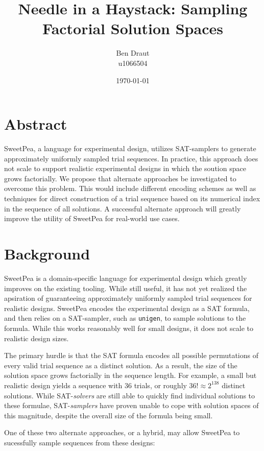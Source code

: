 \documentclass[a4paper]{article}
\title{Needle in a Haystack: Sampling Factorial Solution Spaces}
\author{Ben Draut \\ u1066504}
\date{\today}
\begin{document}
\maketitle


\section*{Abstract}

SweetPea, a language for experimental design, utilizes SAT-samplers to generate approximately uniformly sampled trial sequences. In practice, this approach does not scale to support realistic experimental designs in which the soution space grows factorially. We propose that alternate approaches be investigated to overcome this problem. This would include different encoding schemes as well as techniques for direct construction of a trial sequence based on its numerical index in the sequence of all solutions. A successful alternate approach will greatly improve the utility of SweetPea for real-world use cases.

\section*{Background}

SweetPea is a domain-specific language for experimental design which greatly improves on the existing tooling. While still useful, it has not yet realized the apsiration of guaranteeing approximately uniformly sampled trial sequences for realistic designs. SweetPea encodes the experimental design as a SAT formula, and then relies on a SAT-sampler, such as \texttt{unigen}, to sample solutions to the formula. While this works reasonably well for small designs, it does not scale to realistic design sizes.

The primary hurdle is that the SAT formula encodes all possible permutations of every valid trial sequence as a distinct solution. As a result, the size of the solution space grows factorially in the sequence length. For example, a small but realistic design yields a sequence with $36$ trials, or roughly $36! \approx 2^{138}$ distinct solutions. While SAT-\textit{solvers} are still able to quickly find individual solutions to these formulae, SAT-\textit{samplers} have proven unable to cope with solution spaces of this magnitude, despite the overall size of the formula being small.

One of these two alternate approaches, or a hybrid, may allow SweetPea to sucessfully sample sequences from these designs:
\end{document}
